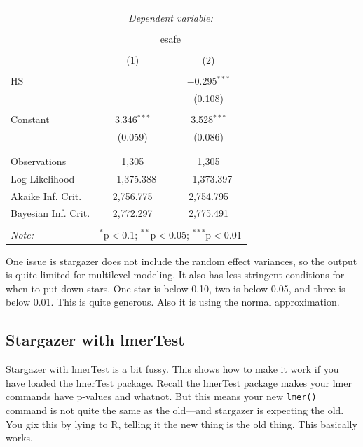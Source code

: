 \documentclass[
  letterpaper,
  DIV=11,
  numbers=noendperiod]{scrreprt}
\begin{document}
\begin{table}[!htbp] \centering 
  \caption{} 
  \label{} 
\begin{tabular}{@{\extracolsep{5pt}}lcc} 
\\[-1.8ex]\hline 
\hline \\[-1.8ex] 
 & \multicolumn{2}{c}{\textit{Dependent variable:}} \\ 
\cline{2-3} 
\\[-1.8ex] & \multicolumn{2}{c}{esafe} \\ 
\\[-1.8ex] & (1) & (2)\\ 
\hline \\[-1.8ex] 
 HS &  & $-$0.295$^{***}$ \\ 
  &  & (0.108) \\ 
  & & \\ 
 Constant & 3.346$^{***}$ & 3.528$^{***}$ \\ 
  & (0.059) & (0.086) \\ 
  & & \\ 
\hline \\[-1.8ex] 
Observations & 1,305 & 1,305 \\ 
Log Likelihood & $-$1,375.388 & $-$1,373.397 \\ 
Akaike Inf. Crit. & 2,756.775 & 2,754.795 \\ 
Bayesian Inf. Crit. & 2,772.297 & 2,775.491 \\ 
\hline 
\hline \\[-1.8ex] 
\textit{Note:}  & \multicolumn{2}{r}{$^{*}$p$<$0.1; $^{**}$p$<$0.05; $^{***}$p$<$0.01} \\ 
\end{tabular} 
\end{table}

One issue is stargazer does not include the random effect variances, so
the output is quite limited for multilevel modeling. It also has less
stringent conditions for when to put down stars. One star is below 0.10,
two is below 0.05, and three is below 0.01. This is quite generous. Also
it is using the normal approximation.

\hypertarget{stargazer-with-lmertest}{%
\subsection{Stargazer with lmerTest}\label{stargazer-with-lmertest}}

Stargazer with lmerTest is a bit fussy. This shows how to make it work
if you have loaded the lmerTest package. Recall the lmerTest package
makes your lmer commands have p-values and whatnot. But this means your
new \texttt{lmer()} command is not quite the same as the old---and
stargazer is expecting the old. You gix this by lying to R, telling it
the new thing is the old thing. This basically works.
\end{document}
